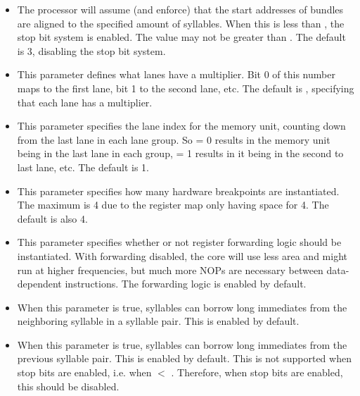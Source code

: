 \begin{itemize}
\begin{itemize}
\item {}

The \rvex{} processor will assume (and enforce) that the start addresses of
bundles are aligned to the specified amount of syllables. When this is less than
, the stop bit system is enabled. The value may not be
greater than . The default is 3, disabling the stop bit
system.

\item {}

This parameter defines what lanes have a multiplier. Bit 0 of this number maps
to the first lane, bit 1 to the second lane, etc. The default is ,
specifying that each lane has a multiplier.

\item {}

This parameter specifies the lane index for the memory unit, counting down from
the last lane in each lane group. So  = 0 results in the
memory unit being in the last lane in each group,  = 1
results in it being in the second to last lane, etc. The default is 1.

\item {}

This parameter specifies how many hardware breakpoints are instantiated. The
maximum is 4 due to the register map only having space for 4. The default is
also 4.

\item {}

This parameter specifies whether or not register forwarding logic should be
instantiated. With forwarding disabled, the core will use less area and might
run at higher frequencies, but much more NOPs are necessary between
data-dependent instructions. The forwarding logic is enabled by default.

\item {}

When this parameter is true, syllables can borrow long immediates from the
neighboring syllable in a syllable pair. This is enabled by default.

\item {}

When this parameter is true, syllables can borrow long immediates from the
previous syllable pair. This is enabled by default. This is not supported when
stop bits are enabled, i.e. when  $<$ .
Therefore, when stop bits are enabled, this should be disabled.


\end{itemize}
\end{itemize}
